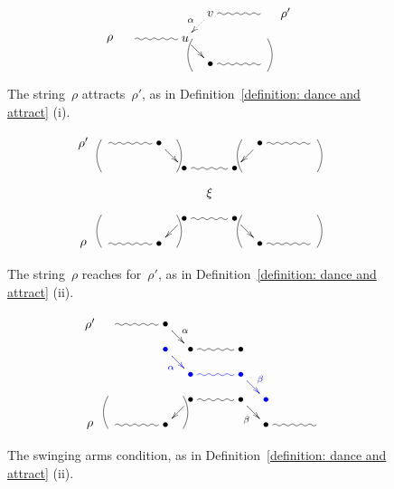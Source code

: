 \documentclass{memo-l}
\theoremstyle{definition}
\begin{document}
\begin{figure}[t]
 	\capstart
\[
\xy
%
(28,7)*+{v}="14";
(42,7)="16";
(49,7)*+{\rho'}="17";
%
(0,0)*+{\rho}="0";
(7,0)="1";
(21,0)*+{u}="3";
%
(28,-7)*+{\bullet}="-4";
(42,-7)="-6";
%
{\ar@{~} "1";"3"};
{\ar "3";"-4"};
{\ar@{~} "-4";"-6"};
%
{\ar@{~} "14";"16"};
%
{\ar@{..>}_{\alpha} "14";"3"};
%
{\ar@/_.3pc/@{-} (23,0);(23,-9)};
{\ar@/^.3pc/@{-} (44,0);(44,-9)};
%
\endxy
\]
	\caption{The string~$\rho$ attracts~$\rho'$, as in Definition~\ref{definition: dance and attract} (i).}
	\label{fig:def-attracts}
\end{figure}

\begin{figure}[t]
 	\capstart
\[
\xy
%
(-35,14)*+{\rho'};
(-28,14)="-14";
(-14,14)*+{\bullet}="-12";
(-7,7)*+{\bullet}="-11";
(7,7)*+{\bullet}="11";
(14,14)*+{\bullet}="12";
(28,14)="14";
%
(0,0)*+{\xi};
%
(-35,-14)*+{\rho};
(-28,-14)="-4";
(-14,-14)*+{\bullet}="-2";
(-7,-7)*+{\bullet}="-1";
(7,-7)*+{\bullet}="1";
(14,-14)*+{\bullet}="2";
(28,-14)="4";
%
{\ar@{~} "-14";"-12"};
{\ar "-12";"-11"};
{\ar@{~} "-11";"11"};
{\ar "12";"11"};
{\ar@{~} "12";"14"};
%
{\ar@/_.3pc/@{-} (-30,15);(-30,6)};
{\ar@/^.3pc/@{-} (-9,15);(-9,6)};
%
{\ar@/^.3pc/@{-} (30,15);(30,6)};
{\ar@/_.3pc/@{-} (9,15);(9,6)};
%
{\ar@/^.3pc/@{-} (-30,-15);(-30,-6)};
{\ar@/_.3pc/@{-} (-9,-15);(-9,-6)};
%
{\ar@/_.3pc/@{-} (30,-15);(30,-6)};
{\ar@/^.3pc/@{-} (9,-15);(9,-6)};
%
{\ar@{~} "-4";"-2"};
{\ar "-1";"-2"};
{\ar@{~} "-1";"1"};
{\ar "1";"2"};
{\ar@{~} "2";"4"};
%
\endxy
\]
	\caption{The string~$\rho$ reaches for~$\rho'$, as in Definition~\ref{definition: dance and attract} (ii).}
	\label{fig:def-dances}
\end{figure}

\begin{figure}[t]
 	\capstart
\[
\xy
%
(-35,14)*+{\rho'};
(-28,14)="-14";
(-14,14)*+{\bullet}="-12";
(-7,7)*+{\bullet}="-11";
(7,7)*+{\bullet}="11";
%
(-14,7)*+{\textcolor{blue}{\bullet}}="a";
(-7,0)*+{\textcolor{blue}{\bullet}}="b";
(7,0)*+{\textcolor{blue}{\bullet}}="c";
(14,-7)*+{\textcolor{blue}{\bullet}}="d";
%
(-35,-14)*+{\rho};
(-28,-14)="-4";
(-14,-14)*+{\bullet}="-2";
(-7,-7)*+{\bullet}="-1";
(7,-7)*+{\bullet}="1";
(14,-14)*+{\bullet}="2";
(28,-14)="4";
%
{\ar@{~} "-14";"-12"};
{\ar^\alpha "-12";"-11"};
{\ar@{~} "-11";"11"};
%
{\ar@/^.3pc/@{-} (-30,-15);(-30,-6)};
{\ar@/_.3pc/@{-} (-9,-15);(-9,-6)};
%
{\ar@{~} "-4";"-2"};
{\ar "-1";"-2"};
{\ar@{~} "-1";"1"};
{\ar_\beta "1";"2"};
{\ar@{~} "2";"4"};
%
{\textcolor{blue}{\ar_\alpha "a";"b"}};
{\textcolor{blue}{\ar@{~} "b";"c"}};
{\textcolor{blue}{\ar^\beta "c";"d"}};
%
\endxy
\]
	\caption{The swinging arms condition, as in Definition~\ref{definition: dance and attract} (ii).}
	\label{fig: swinging arms}
\end{figure}
\end{document}
